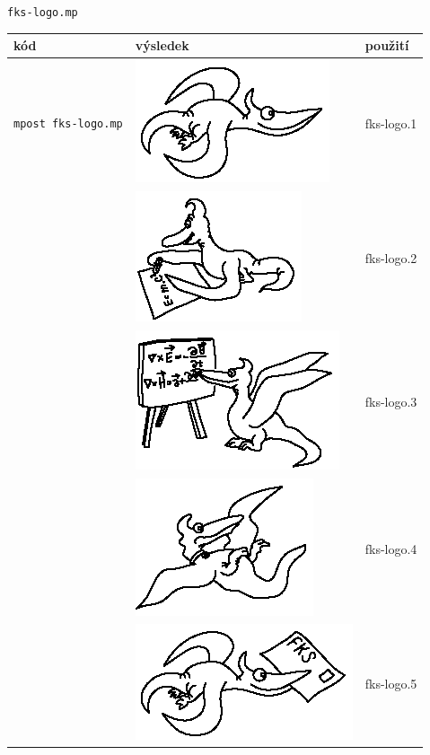 \documentclass[a4paper,10pt]{article}
\begin{document}
{\centering\large\texttt{fks-logo.mp}\nopagebreak\\\medskip}
\begin{tabularx}{\textwidth}{|l|l|X|}\hline
    kód & výsledek & použití\\\hline
    \verb+mpost fks-logo.mp+&\includegraphics{fks-logo_1}& fks-logo.1\\\hline
    &\includegraphics{fks-logo_2}& fks-logo.2\\\hline
    &\includegraphics{fks-logo_3}& fks-logo.3\\\hline
    &\includegraphics{fks-logo_4}& fks-logo.4\\\hline
    &\includegraphics{fks-logo_5}& fks-logo.5\\\hline

\end{tabularx}
\end{document}

